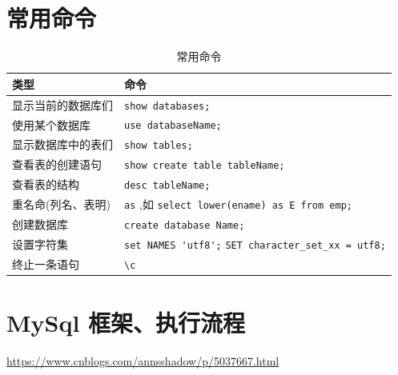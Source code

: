 \documentclass[UTF8,a4paper,12pt]{ctexbook}
\begin{document}
	\section{常用命令}
		\begin{table}[H]
			\centering
			\caption{常用命令}
			\begin{tabular}{p{4cm}<{\centering}|p{11cm}<{\centering}}
				\hline
					类型  & 命令 \\
				\hline
					显示当前的数据库们  & \verb|show databases;| \\
					使用某个数据库	& 	\verb|use databaseName;| \\
					显示数据库中的表们	& \verb|show tables;|	\\
					查看表的创建语句	& \verb|show create table tableName;|	\\
					查看表的结构	& \verb|desc tableName;|	\\
					重名命(列名、表明)	& \verb|as| ,如 \verb|select lower(ename) as E from emp;|	\\
					创建数据库	& \verb|create database Name;|	\\
					设置字符集	& \verb|set NAMES 'utf8';| \verb|SET character_set_xx = utf8;|	\\
					终止一条语句	& \verb|\c|	\\
				\hline
			\end{tabular}
		\end{table}

	\section{MySql 框架、执行流程}
		\url{https://www.cnblogs.com/annsshadow/p/5037667.html}
		
\end{document}
